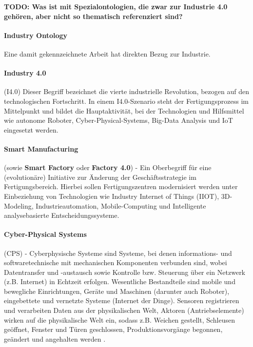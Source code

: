 \documentclass{article}
\begin{document}
\textbf{TODO: Was ist mit Spezialontologien, die zwar zur Industrie 4.0 gehören, aber nicht so thematisch referenziert sind?}

\paragraph{Industry Ontology} Eine damit gekennzeichnete Arbeit hat direkten Bezug zur Industrie.

\paragraph{Industry 4.0} (I4.0) Dieser Begriff bezeichnet die vierte industrielle Revolution, bezogen auf den technologischen Fortschritt. In einem I4.0-Szenario steht der Fertigungsprozess im Mittelpunkt und bildet die Hauptaktivität, bei der Technologien und Hilfsmittel wie autonome Roboter, Cyber-Physical-Systems, Big-Data Analysis und IoT eingesetzt werden.

\paragraph{Smart Manufacturing} (sowie \textbf{Smart Factory} oder \textbf{Factory 4.0}) - Ein Oberbegriff für eine (evolutionäre) Initiative zur Änderung der Geschäftsstrategie im Fertigungsbereich. Hierbei sollen Fertigungszentren modernisiert werden unter Einbeziehung von Technologien wie Industry Internet of Things (IIOT), 3D-Modeling, Industrieautomation, Mobile-Computing und Intelligente analysebasierte Entscheidungssysteme.

\paragraph{Cyber-Physical Systems} (CPS) - Cyberphysische Systeme sind Systeme, bei denen informations- und softwaretechnische mit mechanischen Komponenten verbunden sind, wobei Datentransfer und -austausch sowie Kontrolle bzw. Steuerung über ein Netzwerk (z.B. Internet) in Echtzeit erfolgen. Wesentliche Bestandteile sind mobile und bewegliche Einrichtungen, Geräte und Maschinen (darunter auch Roboter), eingebettete und vernetzte Systeme (Internet der Dinge). Sensoren registrieren und verarbeiten Daten aus der physikalischen Welt, Aktoren (Antriebselemente) wirken auf die physikalische Welt ein, sodass z.B. Weichen gestellt, Schleusen geöffnet, Fenster und Türen geschlossen, Produktionsvorgänge begonnen, geändert und angehalten werden \cite{GablerCPS2024}.
\end{document}
